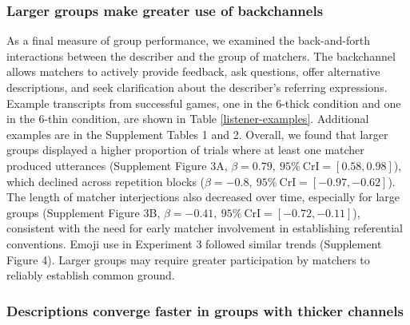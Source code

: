 \documentclass[
  english,
]{article}
\begin{document}
\hypertarget{larger-groups-make-greater-use-of-backchannels}{%
\subsubsection{Larger groups make greater use of backchannels}\label{larger-groups-make-greater-use-of-backchannels}}

As a final measure of group performance, we examined the back-and-forth interactions between the describer and the group of matchers.
The backchannel allows matchers to actively provide feedback, ask questions, offer alternative descriptions, and seek clarification about the describer's referring expressions.
Example transcripts from successful games, one in the 6-thick condition and one in the 6-thin condition, are shown in Table \ref{listener-examples}. Additional examples are in the Supplement Tables 1 and 2.
Overall, we found that larger groups displayed a higher proportion of trials where at least one matcher produced utterances (Supplement Figure 3A, \(\beta=0.79,\:95\%\:\mathrm{CrI}=[0.58, 0.98]\)), which declined across repetition blocks (\(\beta=-0.8,\:95\%\:\mathrm{CrI}=[-0.97, -0.62]\)).
The length of matcher interjections also decreased over time, especially for large groups (Supplement Figure 3B, \(\beta=-0.41,\:95\%\:\mathrm{CrI}=[-0.72, -0.11]\)), consistent with the need for early matcher involvement in establishing referential conventions.
Emoji use in Experiment 3 followed similar trends (Supplement Figure 4).
Larger groups may require greater participation by matchers to reliably establish common ground.

\hypertarget{descriptions-converge-faster-in-groups-with-thicker-channels}{%
\subsubsection{Descriptions converge faster in groups with thicker channels}\label{descriptions-converge-faster-in-groups-with-thicker-channels}}
\end{document}
